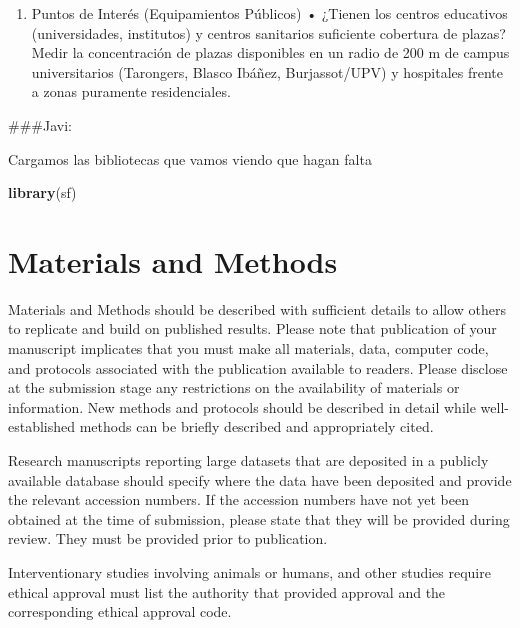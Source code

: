 \documentclass[notspecified,article,submit,moreauthors,pdftex]{Definitions/mdpi}
\newenvironment{Shaded}{\begin{snugshade}}{\end{snugshade}}
\newcommand{\FunctionTok}[1]{\textcolor[rgb]{0.13,0.29,0.53}{\textbf{#1}}}
\newcommand{\NormalTok}[1]{#1}
\begin{document}
\begin{enumerate}
  • ¿Se correlaciona la densidad de aparcamientos con la renta media o
  la densidad poblacional? Verificar si los barrios con mayor densidad
  residencial o menor renta disponen de una proporción equivalente de
  infraestructura ciclista frente al centro histórico y zonas
  turísticas/comerciales.
\item
  Puntos de Interés (Equipamientos Públicos) • ¿Tienen los centros
  educativos (universidades, institutos) y centros sanitarios suficiente
  cobertura de plazas? Medir la concentración de plazas disponibles en
  un radio de 200 m de campus universitarios (Tarongers, Blasco Ibáñez,
  Burjassot/UPV) y hospitales frente a zonas puramente residenciales.
\end{enumerate}

\#\#\#Javi:

Cargamos las bibliotecas que vamos viendo que hagan falta

\begin{Shaded}
\begin{Highlighting}[]
\FunctionTok{library}\NormalTok{(sf)}
\end{Highlighting}
\end{Shaded}

\section{Materials and Methods}\label{materials-and-methods}

Materials and Methods should be described with sufficient details to
allow others to replicate and build on published results. Please note
that publication of your manuscript implicates that you must make all
materials, data, computer code, and protocols associated with the
publication available to readers. Please disclose at the submission
stage any restrictions on the availability of materials or information.
New methods and protocols should be described in detail while
well-established methods can be briefly described and appropriately
cited.

Research manuscripts reporting large datasets that are deposited in a
publicly available database should specify where the data have been
deposited and provide the relevant accession numbers. If the accession
numbers have not yet been obtained at the time of submission, please
state that they will be provided during review. They must be provided
prior to publication.

Interventionary studies involving animals or humans, and other studies
require ethical approval must list the authority that provided approval
and the corresponding ethical approval code.
\end{document}

